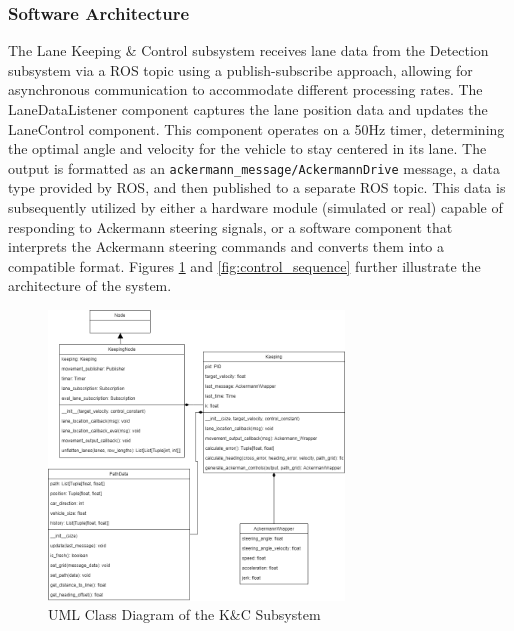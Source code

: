 \documentclass[titlepage,draft]{article}
\begin{document}
{\subsubsection{Software Architecture}

The Lane Keeping \& Control subsystem receives lane data from the Detection subsystem via a ROS topic using a publish-subscribe approach, allowing for asynchronous communication to accommodate different processing rates. The LaneDataListener component captures the lane position data and updates the LaneControl component. This component operates on a 50Hz timer, determining the optimal angle and velocity for the vehicle to stay centered in its lane. The output is formatted as an
\texttt{ackermann\_message/AckermannDrive} message,
a data type provided by ROS, and then published to a separate ROS topic. This data is subsequently utilized by either a hardware module (simulated or real) capable of responding to Ackermann steering signals, or a software component that interprets the Ackermann steering commands and converts them into a compatible format. Figures \ref{fig:control_class} and \ref{fig:control_sequence} further illustrate the architecture of the system.


\begin{figure}
	\centering
	\includegraphics[width=0.7\textwidth]{KnC_diagrams}
	\caption{UML Class Diagram of the K\&C Subsystem}
	\label{fig:control_class}
\end{figure}

}
\end{document}
